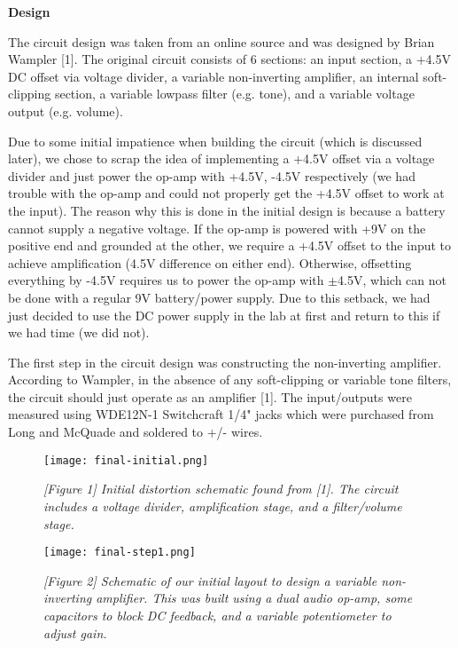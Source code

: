 \documentclass[11pt]{article}
\begin{document}
\vspace{10pt}


 \selectfont 

\nd \textbf{Design}

\vspace{5pt}

\selectfont The circuit design was taken from an online source and was designed by Brian Wampler [1]. The original circuit consists of 6 sections: an input section, a +4.5V DC offset via voltage divider, a variable non-inverting amplifier, an internal soft-clipping section, a variable lowpass filter (e.g. tone), and a variable voltage output (e.g. volume).   

Due to some initial impatience when building the circuit (which is discussed later), we chose to scrap the idea of implementing a +4.5V offset via a voltage divider and just power the op-amp with +4.5V, -4.5V respectively (we had trouble with the op-amp and could not properly get the +4.5V offset to work at the input). The reason why this is done in the initial design is because a battery cannot supply a negative voltage. If the op-amp is powered with +9V on the positive end and grounded at the other, we require a +4.5V offset to the input to achieve amplification (4.5V difference on either end). Otherwise, offsetting everything by -4.5V requires us to power the op-amp with $\pm$4.5V, which can not be done with a regular 9V battery/power supply. Due to this setback, we had just decided to use the DC power supply in the lab at first and return to this if we had time (we did not). 

The first step in the circuit design was constructing the non-inverting amplifier. According to Wampler, in the absence of any soft-clipping or variable tone filters, the circuit should just operate as an amplifier [1]. The input/outputs were measured using WDE12N-1 Switchcraft 1/4" jacks which were purchased from Long and McQuade and soldered to +/- wires.

\begin{figure}[H]
    \centering
    \texttt{[image: final-initial.png]}
    \caption*{\textit{[Figure 1] Initial distortion schematic found from [1]. The circuit includes a voltage divider, amplification stage, and a filter/volume stage.}}
\end{figure}


\begin{figure}[H]
    \centering
    \texttt{[image: final-step1.png]}
    \caption*{\textit{[Figure 2] Schematic of our initial layout to design a variable non-inverting amplifier. This was built using a dual audio op-amp, some capacitors to block DC feedback, and a variable potentiometer to adjust gain.}}
\end{figure}
\end{document}
